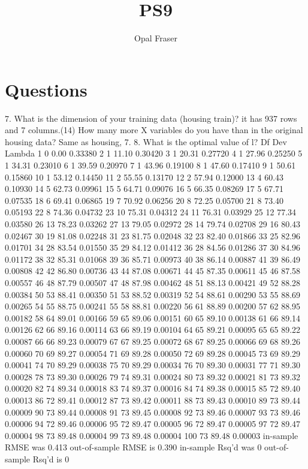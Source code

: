 \documentclass{article}
\title{PS9}
\author{Opal Fraser}
\begin{document}
\maketitle


\section{Questions}
7. What is the dimension of your training data (housing train)? it has 937 rows and 7 columns.(14) 
How many more X variables do you have than in the original housing data?
Same as housing, 7. 
8. What is the optimal value of l? 
     Df Dev   Lambda
1    0  0.00 0.33380
2    1 11.10 0.30420
3    1 20.31 0.27720
4    1 27.96 0.25250
5    1 34.31 0.23010
6    1 39.59 0.20970
7    1 43.96 0.19100
8    1 47.60 0.17410
9    1 50.61 0.15860
10   1 53.12 0.14450
11   2 55.55 0.13170
12   2 57.94 0.12000
13   4 60.43 0.10930
14   5 62.73 0.09961
15   5 64.71 0.09076
16   5 66.35 0.08269
17   5 67.71 0.07535
18   6 69.41 0.06865
19   7 70.92 0.06256
20   8 72.25 0.05700
21   8 73.40 0.05193
22   8 74.36 0.04732
23  10 75.31 0.04312
24  11 76.31 0.03929
25  12 77.34 0.03580
26  13 78.23 0.03262
27  13 79.05 0.02972
28  14 79.74 0.02708
29  16 80.43 0.02467
30  19 81.08 0.02248
31  23 81.75 0.02048
32  23 82.40 0.01866
33  25 82.96 0.01701
34  28 83.54 0.01550
35  29 84.12 0.01412
36  28 84.56 0.01286
37  30 84.96 0.01172
38  32 85.31 0.01068
39  36 85.71 0.00973
40  38 86.14 0.00887
41  39 86.49 0.00808
42  42 86.80 0.00736
43  44 87.08 0.00671
44  45 87.35 0.00611
45  46 87.58 0.00557
46  48 87.79 0.00507
47  48 87.98 0.00462
48  51 88.13 0.00421
49  52 88.28 0.00384
50  53 88.41 0.00350
51  53 88.52 0.00319
52  54 88.61 0.00290
53  55 88.69 0.00265
54  55 88.75 0.00241
55  58 88.81 0.00220
56  61 88.89 0.00200
57  62 88.95 0.00182
58  64 89.01 0.00166
59  65 89.06 0.00151
60  65 89.10 0.00138
61  66 89.14 0.00126
62  66 89.16 0.00114
63  66 89.19 0.00104
64  65 89.21 0.00095
65  65 89.22 0.00087
66  66 89.23 0.00079
67  67 89.25 0.00072
68  67 89.25 0.00066
69  68 89.26 0.00060
70  69 89.27 0.00054
71  69 89.28 0.00050
72  69 89.28 0.00045
73  69 89.29 0.00041
74  70 89.29 0.00038
75  70 89.29 0.00034
76  70 89.30 0.00031
77  71 89.30 0.00028
78  73 89.30 0.00026
79  74 89.31 0.00024
80  73 89.32 0.00021
81  73 89.32 0.00020
82  74 89.34 0.00018
83  74 89.37 0.00016
84  74 89.38 0.00015
85  72 89.40 0.00013
86  72 89.41 0.00012
87  73 89.42 0.00011
88  73 89.43 0.00010
89  73 89.44 0.00009
90  73 89.44 0.00008
91  73 89.45 0.00008
92  73 89.46 0.00007
93  73 89.46 0.00006
94  72 89.46 0.00006
95  72 89.47 0.00005
96  72 89.47 0.00005
97  72 89.47 0.00004
98  73 89.48 0.00004
99  73 89.48 0.00004
100 73 89.48 0.00003
in-sample RMSE was 0.413
out-of-sample RMSE is 0.390
in-sample Rsq'd was 0
out-of-sample Rsq'd is 0
\end{document}
